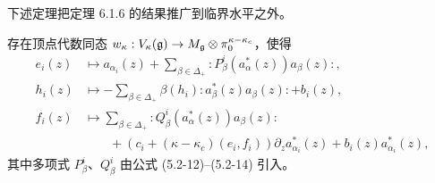 下述定理把定理 6.1.6 的结果推广到临界水平之外。

\renewcommand{\thetheorem}{6.2.1}
\begin{theorem}
    存在顶点代数同态 $w_\kappa:V_\kappa(\mathfrak{g})\to
    M_{\mathfrak g}\otimes\pi_0^{\kappa-\kappa_c}$，使得
    \begin{equation}
        \begin{aligned}
            e_i(z)&\mapsto a_{\alpha_i}(z)+\sum_{\beta\in\Delta_+}
            :\!P^i_\beta(a^*_\alpha(z))a_\beta(z)\!:,\\
            h_i(z)&\mapsto-\sum_{\beta\in\Delta_+}
            \beta(h_i):\!a^*_\beta(z)a_\beta(z)\!:+b_i(z),\\
            f_i(z)&\mapsto\sum_{\beta\in\Delta_+}
            :\!Q^i_\beta(a^*_\alpha(z))a_\beta(z)\!:\\
            &\qquad+\left(c_i+(\kappa-\kappa_c)(e_i,f_i)\right)
            \partial_za^*_{\alpha_i}(z)+b_i(z)a^*_{\alpha_i}(z),
        \end{aligned}
        \tag{6.2-2}
    \end{equation}
    其中多项式 $P^i_\beta$、$Q^i_\beta$ 由公式 (5.2-12)--(5.2-14) 引入。
\end{theorem}

